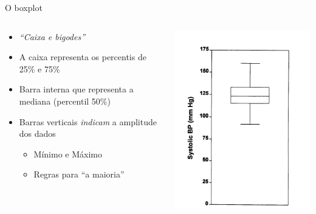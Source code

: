\documentclass{beamer}
\begin{document}
\begin{frame}{\scriptsize O boxplot}
  \begin{columns}
    \begin{column}{7cm}
      \begin{itemize}
        \footnotesize
      \item {\em ``Caixa e bigodes''}
      \item A caixa representa os percentis de 25\% e 75\%
      \item Barra interna que representa a mediana (percentil 50\%)
      \item Barras verticais {\em indicam} a amplitude dos dados
        \begin{itemize}
          \scriptsize
        \item Mínimo e Máximo
        \item Regras para ``a maioria''
        \end{itemize}
      \end{itemize}
      \end{column}
      \begin{column}{5cm}
          \includegraphics[height=\textheight]{Cap3/boxplot}
      \end{column}
  \end{columns}
\end{frame}
\end{document}
